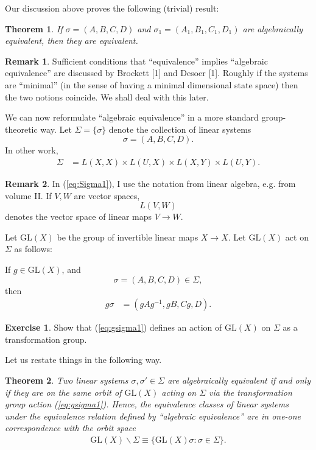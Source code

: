 \documentclass[12pt]{book}
\theoremstyle{plain}
\newtheorem{theorem}{Theorem}[section]
\theoremstyle{definition}
\newtheorem{exercise}{Exercise}[section]
\newtheorem*{remark}{Remark}
\begin{document}
Our discussion above proves the following (trivial) result:
\begin{theorem}
    If $\sigma = (A, B, C, D)$ and $\sigma_1 = (A_1, B_1, C_1, D_1)$ are algebraically equivalent, then they are equivalent.
\end{theorem}

\begin{remark}
    Sufficient conditions that ``equivalence'' implies ``algebraic equivalence'' are discussed by Brockett [1] and Desoer [1]. %
    Roughly if the systems are ``minimal'' (in the sense of having a minimal dimensional state space) then the two notions coincide.
    We shall deal with this later.
\end{remark}

We can now reformulate ``algebraic equivalence'' in a more standard group-theoretic way.
Let $\Sigma = \{\sigma\}$ denote the collection of linear systems
$$\sigma = (A, B, C, D).$$
In other work, %
\begin{align} \label{eq:Sigma1}
    \Sigma &= L(X, X) \times L(U, X) \times L(X, Y) \times L(U, Y).
\end{align}

\begin{remark}
    In (\ref{eq:Sigma1}), I use the notation from linear algebra, e.g. from volume II. If $V, W$ are vector spaces,
    $$L(V, W)$$
    denotes the vector space of linear maps $V \to W$.
\end{remark}

Let $\mathrm{GL}(X)$ be the group of invertible linear maps $X \to X$.
Let $\mathrm{GL}(X)$ act on $\Sigma$ as follows:

If $g \in \mathrm{GL}(X)$, and
$$\sigma = (A, B, C, D) \in \Sigma,$$
then
\begin{align} \label{eq:gsigma1}
    g\sigma &= (gAg^{-1}, gB, Cg, D).
\end{align}

\begin{exercise}
    Show that (\ref{eq:gsigma1}) defines an action of $\mathrm{GL}(X)$ on $\Sigma$ as a transformation group.
\end{exercise}

Let us restate things in the following way.

\begin{theorem}
    Two linear systems $\sigma, \sigma' \in \Sigma$ are algebraically equivalent if and only if they are on the same orbit of $\mathrm{GL}(X)$ acting on $\Sigma$ via the transformation group action (\ref{eq:gsigma1}).
    Hence, the equivalence classes of linear systems under the equivalence relation defined by ``algebraic equivalence'' are in one-one correspondence with the orbit space
    \begin{align} \label{eq:OrbitSpace1}
        \mathrm{GL}(X)\backslash\Sigma \equiv \{\mathrm{GL}(X)\sigma : \sigma \in \Sigma\}.
    \end{align}
\end{theorem}
\end{document}
